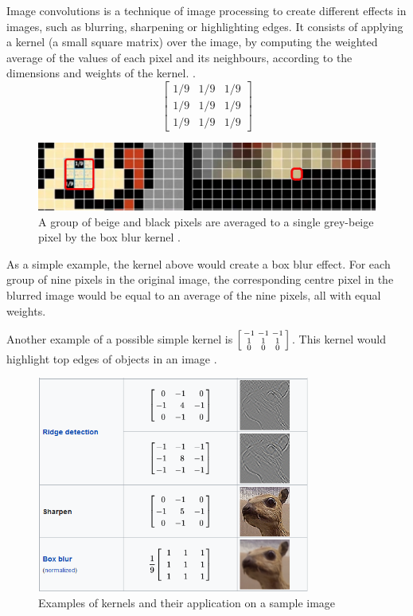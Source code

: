 ﻿\documentclass[12pt,a4paper,notitlepage]{article}
\begin{document}
Image convolutions is a technique of image processing to create different effects in images, such as blurring, sharpening or highlighting edges. It consists of applying a kernel (a small square matrix) over the image, by computing the weighted average of the values of each pixel and its neighbours, according to the dimensions and weights of the kernel. \cite{sanderson_convolutions_2020}.
\begin{displaymath}
 \begin{bmatrix}
  1/9 & 1/9 & 1/9 \\
  1/9 & 1/9 & 1/9 \\
  1/9 & 1/9 & 1/9
 \end{bmatrix}
\end{displaymath}
\begin{figure}[htbp]
 \centering
  \includegraphics[width=1.00\textwidth]{images/box-blur.jpg}
 \caption{A group of beige and black pixels are averaged to a single grey-beige pixel by the box blur kernel \cite{sanderson_convolutions_2020}.}
 \label{fig:box-blur}
\end{figure}

As a simple example, the kernel above would create a box blur effect. For each group of nine pixels in the original image, the corresponding centre pixel in the blurred image would be equal to an average of the nine pixels, all with equal weights.

Another example of a possible simple kernel is \(\begin{bsmallmatrix}-1 & -1 & -1 \\ 1 & 1 & 1 \\ 0 & 0 & 0\end{bsmallmatrix}\). This kernel would highlight top edges of objects in an image \cite{deep_lizard_convolutional_2017}.
\begin{figure}[htbp]
 \centering
  \includegraphics[width=0.8\textwidth]{images/image-convolutions-examples.png}
 \caption{Examples of kernels and their application on a sample image \cite{wikipedia_collaborators_kernel_2022}}
 \label{fig:image-convolutions-examples}
\end{figure}
\end{document}
